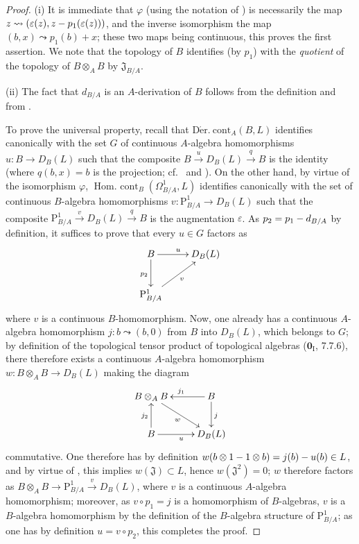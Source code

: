 \begin{proof}
(i) It is immediate that $\varphi$ (using the notation of ) is necessarily the map $z\leadsto(\varepsilon(z),z- p_1(\varepsilon(z)))$, and the inverse isomorphism the map $(b,x)\leadsto p_1(b)+x$; these two maps being continuous, this proves the first assertion.
We note that the topology of $B$ identifies (by $p_1$) with the \emph{quotient} of the topology of $B\otimes_A B$ by $\mathfrak{J}_{B/A}$.

(ii) The fact that $d_{B/A}$ is an $A$-derivation of $B$ follows from the definition  and from .

  To prove the universal property, recall that $\operatorname{D\acute{e}r.\ cont}_A(B,L)$ identifies canonically with the set $G$ of continuous $A$-algebra homomorphisms $u:B\to D_B(L)$ such that the composite $B\xrightarrow{u}D_B(L)\xrightarrow{q}B$ is the identity (where $q(b,x)=b$ is the projection; cf.\  and ).
On the other hand, by virtue of the isomorphism $\varphi$, $\operatorname{Hom.\ cont}_B(\Omega^1_{B/A},L)$ identifies canonically with the set of continuous $B$-algebra homomorphisms $v:\mathrm{P}^1_{B/A}\to D_B(L)$ such that the composite $\mathrm{P}^1_{B/A}\xrightarrow{v}D_B(L)\xrightarrow{q}B$ is the augmentation $\varepsilon$.
As $p_2=p_1- d_{B/A}$ by definition, it suffices to prove that every $u\in G$ factors as
\[
\xymatrix{
  B \ar[r]^u \ar[d]_{p_2} & D_B(L) \\
  \mathrm{P}^1_{B/A} \ar[ur]_v &
}
\]
where $v$ is a continuous $B$-homomorphism.
Now, one already has a continuous $A$-algebra homomorphism $j:b\leadsto(b,0)$ from $B$ into $D_B(L)$, which belongs to $G$; by definition of the topological tensor product of topological algebras ($\mathbf{0}_{\mathrm I}$, 7.7.6), there therefore exists a continuous $A$-algebra homomorphism $w:B\otimes_A B\to D_B(L)$ making the diagram
\[
\xymatrix{
  B\otimes_A B \ar[dr]_w & B \ar[l]_{j_1} \ar[d]^j \\
  B \ar[u]^{j_2} \ar[r]_u & D_B(L)
}
\]
commutative.
\mbox{One} therefore has by definition $w(b\otimes 1- 1\otimes b)=j(b)- u(b)\in L$, and by virtue of , this implies $w(\mathfrak{J})\subset L$, hence $w(\mathfrak{J}^2)=0$; $w$ therefore factors as $B\otimes_A B\to\mathrm{P}^1_{B/A}\xrightarrow{v}D_B(L)$, where $v$ is a continuous $A$-algebra homomorphism; moreover, as $v\circ p_1=j$ is a homomorphism of $B$-algebras, $v$ is a $B$-algebra homomorphism by the definition of the $B$-algebra structure of $\mathrm{P}^1_{B/A}$; as one has by definition $u=v\circ p_2$, this completes the proof.
\end{proof}

